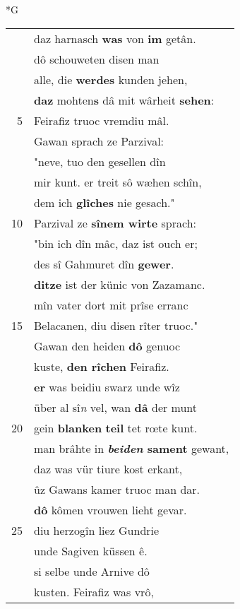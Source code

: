 \documentclass[8pt,a4paper,notitlepage]{article}
\begin{document}
\begin{table}[ht]
\begin{minipage}[t]{0.5\linewidth}
\small
\begin{center}*G
\end{center}
\begin{tabular}{rl}
 & daz harnasch \textbf{was} von \textbf{im} getân.\\ 
 & dô schouweten disen man\\ 
 & alle, die \textbf{werdes} kunden jehen,\\ 
 & \textbf{daz} mohten\textbf{s} dâ mit wârheit \textbf{sehen}:\\ 
5 & Feirafiz truoc vremdiu mâl.\\ 
 & Gawan sprach ze Parzival:\\ 
 & "neve, tuo den gesellen dîn\\ 
 & mir kunt. er treit sô wæhen schîn,\\ 
 & dem ich \textbf{glîches} nie gesach."\\ 
10 & Parzival ze \textbf{sînem wirte} sprach:\\ 
 & "bin ich dîn mâc, daz ist ouch er;\\ 
 & des sî Gahmuret dîn \textbf{gewer}.\\ 
 & \textbf{ditze} ist der künic von Zazamanc.\\ 
 & mîn vater dort mit prîse erranc\\ 
15 & Belacanen, diu disen rîter truoc."\\ 
 & Gawan den heiden \textbf{dô} genuoc\\ 
 & kuste, \textbf{den rîchen} Feirafiz.\\ 
 & \textbf{er} was beidiu swarz unde wîz\\ 
 & über al sî\textit{n} vel, wan \textbf{dâ} der munt\\ 
20 & gein \textbf{blanken} \textbf{teil} tet rœte kunt.\\ 
 & man brâhte in \textbf{\textit{beiden} sament} gewant,\\ 
 & daz was vür tiure kost erkant,\\ 
 & ûz Gawans kamer truoc man dar.\\ 
 & \textbf{dô} kômen vrouwen lieht gevar.\\ 
25 & diu herzogîn liez Gundrie\\ 
 & unde Sagiven küssen ê.\\ 
 & si selbe unde Arnive dô\\ 
 & kusten. Feirafiz was vrô,\\ 

\end{tabular}
\end{minipage}
\end{table}
\end{document}
